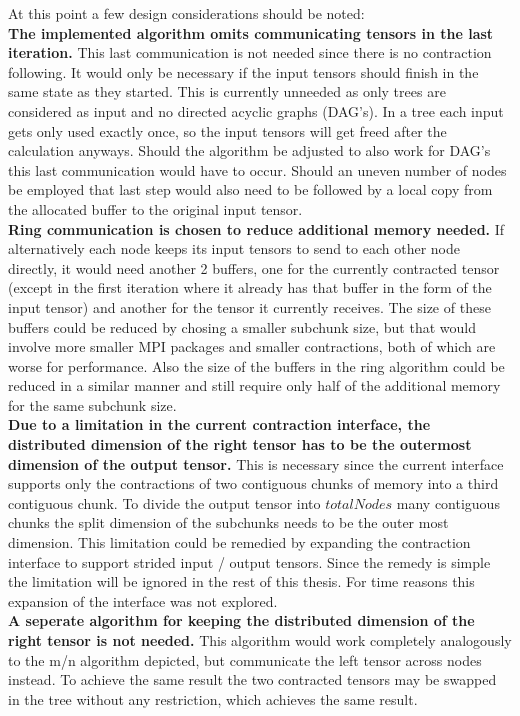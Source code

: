 At this point a few design considerations should be noted:\\
\textbf{The implemented algorithm omits communicating tensors in the last iteration.}
This last communication is not needed since there is no contraction following.
It would only be necessary if the input tensors should finish in the same state as they started.
This is currently unneeded as only trees are considered as input and no directed acyclic graphs (DAG's).
In a tree each input gets only used exactly once, so the input tensors will get freed after the calculation anyways.
Should the algorithm be adjusted to also work for DAG's this last communication would have to occur.
Should an uneven number of nodes be employed that last step would also need to be followed by a local copy from the allocated buffer to the original input tensor.\\
\textbf{Ring communication is chosen to reduce additional memory needed.}
If alternatively each node keeps its input tensors to send to each other node directly, it would need another 2 buffers, one for the currently contracted tensor (except in the first iteration where it already has that buffer in the form of the input tensor) and another for the tensor it currently receives.
The size of these buffers could be reduced by chosing a smaller subchunk size, but that would involve more smaller MPI packages and smaller contractions, both of which are worse for performance.
Also the size of the buffers in the ring algorithm could be reduced in a similar manner and still require only half of the additional memory for the same subchunk size.\\
\textbf{Due to a limitation in the current contraction interface, the distributed dimension of the right tensor has to be the outermost dimension of the output tensor.}
This is necessary since the current interface supports only the contractions of two contiguous chunks of memory into a third contiguous chunk.
To divide the output tensor into $totalNodes$ many contiguous chunks the split dimension of the subchunks needs to be the outer most dimension.
This limitation could be remedied by expanding the contraction interface to support strided input / output tensors.
Since the remedy is simple the limitation will be ignored in the rest of this thesis.
For time reasons this expansion of the interface was not explored.\\
\textbf{A seperate algorithm for keeping the distributed dimension of the right tensor is not needed.}
This algorithm would work completely analogously to the m/n algorithm depicted, but communicate the left tensor across nodes instead.
To achieve the same result the two contracted tensors may be swapped in the tree without any restriction, which achieves the same result.


